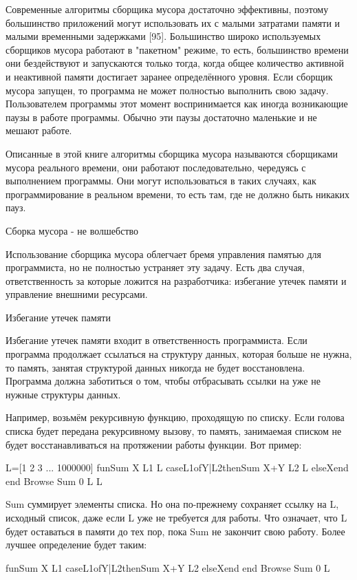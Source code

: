 Современные алгоритмы сборщика мусора достаточно эффективны, поэтому большинство приложений могут использовать их с малыми затратами памяти и малыми временными задержками [95]. Большинство широко используемых сборщиков мусора работают в "пакетном" режиме, то есть, большинство времени они бездействуют и запускаются только тогда, когда общее количество активной и неактивной памяти достигает заранее определённого уровня. Если сборщик мусора запущен, то программа не может полностью выполнить свою задачу. Пользователем программы этот момент воспринимается как иногда возникающие паузы в работе программы. Обычно эти паузы достаточно маленькие и не мешают работе.

Описанные в этой книге алгоритмы сборщика мусора называются сборщиками мусора реального времени, они работают последовательно, чередуясь с выполнением программы. Они могут использоваться в таких случаях, как программирование в реальном времени, то есть там, где не должно быть никаких пауз.

Сборка мусора - не волшебство

Использование сборщика мусора облегчает бремя управления памятью для программиста, но не полностью устраняет эту задачу. Есть два случая, ответственность за которые ложится на разработчика: избегание утечек памяти и управление внешними ресурсами.

Избегание утечек памяти

Избегание утечек памяти входит в ответственность программиста. Если программа продолжает ссылаться на структуру данных, которая больше не нужна, то память, занятая структурой данных никогда не будет восстановлена. Программа должна заботиться о том, чтобы отбрасывать ссылки на уже не нужные структуры данных.

Например, возьмём рекурсивную функцию, проходящую по списку. Если голова списка будет передана рекурсивному вызову, то память, занимаемая списком не будет восстанавливаться на протяжении работы функции. Вот пример:

L=[1 2 3 ... 1000000]
fun{Sum X L1 L}
caseL1ofY|L2then{Sum X+Y L2 L}
elseXend
end
{Browse {Sum 0 L L}}

Sum суммирует элементы списка. Но она по-прежнему сохраняет ссылку на L, исходный список, даже если L уже не требуется для работы. Что означает, что L будет оставаться в памяти до тех пор, пока Sum не закончит свою работу. Более лучшее определение будет таким:

fun{Sum X L1}
caseL1ofY|L2then{Sum X+Y L2}
elseXend
end
{Browse {Sum 0 L}}

